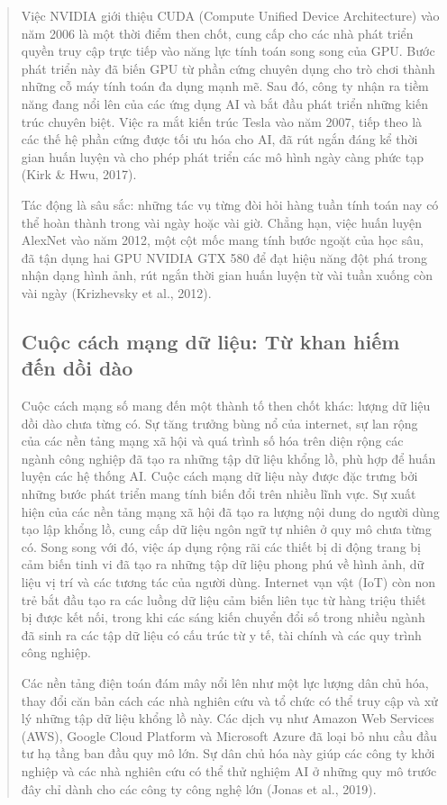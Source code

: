 \begin{quote}
Việc NVIDIA giới thiệu CUDA (Compute Unified Device Architecture) vào năm 2006 là một thời điểm then chốt, cung cấp cho các nhà phát triển quyền truy cập trực tiếp vào năng lực tính toán song song của GPU. Bước phát triển này đã biến GPU từ phần cứng chuyên dụng cho trò chơi thành những cỗ máy tính toán đa dụng mạnh mẽ. Sau đó, công ty nhận ra tiềm năng đang nổi lên của các ứng dụng AI và bắt đầu phát triển những kiến trúc chuyên biệt. Việc ra mắt kiến trúc Tesla vào năm 2007, tiếp theo là các thế hệ phần cứng được tối ưu hóa cho AI, đã rút ngắn đáng kể thời gian huấn luyện và cho phép phát triển các mô hình ngày càng phức tạp (Kirk \& Hwu, 2017).

Tác động là sâu sắc: những tác vụ từng đòi hỏi hàng tuần tính toán nay có thể hoàn thành trong vài ngày hoặc vài giờ. Chẳng hạn, việc huấn luyện AlexNet vào năm 2012, một cột mốc mang tính bước ngoặt của học sâu, đã tận dụng hai GPU NVIDIA GTX 580 để đạt hiệu năng đột phá trong nhận dạng hình ảnh, rút ngắn thời gian huấn luyện từ vài tuần xuống còn vài ngày (Krizhevsky et al., 2012).

\subsection{Cuộc cách mạng dữ liệu: Từ khan hiếm đến dồi dào}

Cuộc cách mạng số mang đến một thành tố then chốt khác: lượng dữ liệu dồi dào chưa từng có. Sự tăng trưởng bùng nổ của internet, sự lan rộng của các nền tảng mạng xã hội và quá trình số hóa trên diện rộng các ngành công nghiệp đã tạo ra những tập dữ liệu khổng lồ, phù hợp để huấn luyện các hệ thống AI. Cuộc cách mạng dữ liệu này được đặc trưng bởi những bước phát triển mang tính biến đổi trên nhiều lĩnh vực. Sự xuất hiện của các nền tảng mạng xã hội đã tạo ra lượng nội dung do người dùng tạo lập khổng lồ, cung cấp dữ liệu ngôn ngữ tự nhiên ở quy mô chưa từng có. Song song với đó, việc áp dụng rộng rãi các thiết bị di động trang bị cảm biến tinh vi đã tạo ra những tập dữ liệu phong phú về hình ảnh, dữ liệu vị trí và các tương tác của người dùng. Internet vạn vật (IoT) còn non trẻ bắt đầu tạo ra các luồng dữ liệu cảm biến liên tục từ hàng triệu thiết bị được kết nối, trong khi các sáng kiến chuyển đổi số trong nhiều ngành đã sinh ra các tập dữ liệu có cấu trúc từ y tế, tài chính và các quy trình công nghiệp.

Các nền tảng điện toán đám mây nổi lên như một lực lượng dân chủ hóa, thay đổi căn bản cách các nhà nghiên cứu và tổ chức có thể truy cập và xử lý những tập dữ liệu khổng lồ này. Các dịch vụ như Amazon Web Services (AWS), Google Cloud Platform và Microsoft Azure đã loại bỏ nhu cầu đầu tư hạ tầng ban đầu quy mô lớn. Sự dân chủ hóa này giúp các công ty khởi nghiệp và các nhà nghiên cứu có thể thử nghiệm AI ở những quy mô trước đây chỉ dành cho các công ty công nghệ lớn (Jonas et al., 2019).


\end{quote}

